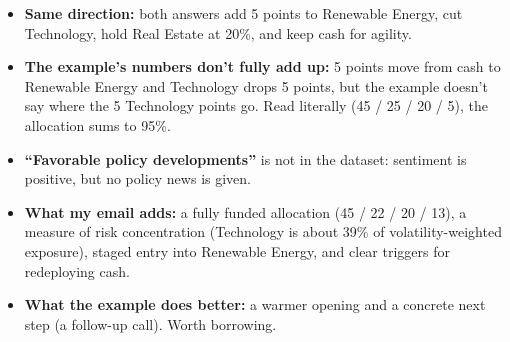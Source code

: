 \documentclass[11pt]{article}
\begin{document}
\begin{itemize}[leftmargin=1.5em, itemsep=3pt]
  \item \textbf{Same direction:} both answers add 5 points to Renewable
  Energy, cut Technology, hold Real Estate at 20\%, and keep cash for agility.
  \item \textbf{The example's numbers don't fully add up:} 5 points move from
  cash to Renewable Energy and Technology drops 5 points, but the example
  doesn't say where the 5 Technology points go. Read literally (45 / 25 / 20 /
  5), the allocation sums to 95\%.
  \item \textbf{``Favorable policy developments''} is not in the dataset:
  sentiment is positive, but no policy news is given.
  \item \textbf{What my email adds:} a fully funded allocation (45 / 22 / 20 /
  13), a measure of risk concentration (Technology is about 39\% of
  volatility-weighted exposure), staged entry into Renewable Energy, and clear
  triggers for redeploying cash.
  \item \textbf{What the example does better:} a warmer opening and a concrete
  next step (a follow-up call). Worth borrowing.
\end{itemize}
\end{document}
